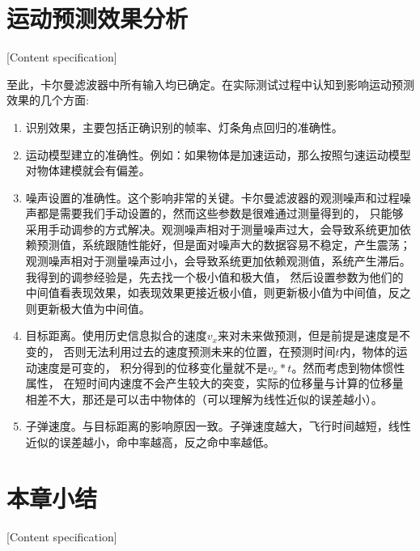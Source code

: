



\section{运动预测效果分析}[Content specification]

至此，卡尔曼滤波器中所有输入均已确定。在实际测试过程中认知到影响运动预测效果的几个方面:
\begin{enumerate}[itemsep=2pt,topsep=0pt,parsep=0pt]
    \item 识别效果，主要包括正确识别的帧率、灯条角点回归的准确性。
    \item 运动模型建立的准确性。例如：如果物体是加速运动，那么按照匀速运动模型对物体建模就会有偏差。
    \item 噪声设置的准确性。这个影响非常的关键。卡尔曼滤波器的观测噪声和过程噪声都是需要我们手动设置的，然而这些参数是很难通过测量得到的，
    只能够采用手动调参的方式解决。观测噪声相对于测量噪声过大，会导致系统更加依赖预测值，系统跟随性能好，但是面对噪声大的数据容易不稳定，产生震荡；
    观测噪声相对于测量噪声过小，会导致系统更加依赖观测值，系统产生滞后。我得到的调参经验是，先去找一个极小值和极大值，
    然后设置参数为他们的中间值看表现效果，如表现效果更接近极小值，则更新极小值为中间值，反之则更新极大值为中间值。
    \item 目标距离。使用历史信息拟合的速度$v_x$来对未来做预测，但是前提是速度是不变的，
    否则无法利用过去的速度预测未来的位置，在预测时间$t$内，物体的运动速度是可变的，
    积分得到的位移变化量就不是$v_x*t$。然而考虑到物体惯性属性，
    在短时间内速度不会产生较大的突变，实际的位移量与计算的位移量相差不大，那还是可以击中物体的（可以理解为线性近似的误差越小）。
    \item 子弹速度。与目标距离的影响原因一致。子弹速度越大，飞行时间越短，线性近似的误差越小，命中率越高，反之命中率越低。

\end{enumerate}

\section{本章小结}[Content specification]

